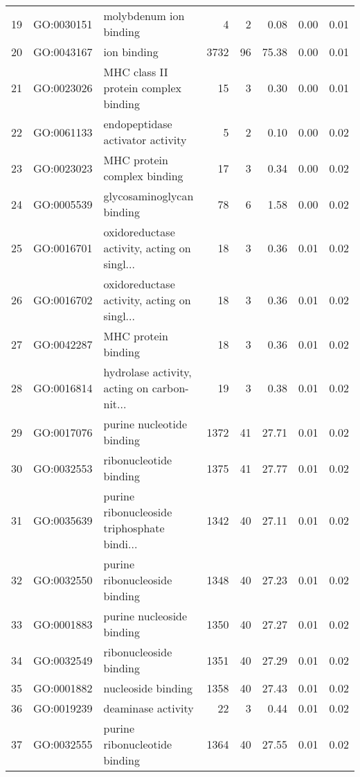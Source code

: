 \begin{table}[ht]
\begin{tabular}{rllrrrrr}
  19 & GO:0030151 & molybdenum ion binding &   4 &   2 & 0.08 & 0.00 & 0.01 \\ 
  20 & GO:0043167 & ion binding & 3732 &  96 & 75.38 & 0.00 & 0.01 \\ 
  21 & GO:0023026 & MHC class II protein complex binding &  15 &   3 & 0.30 & 0.00 & 0.01 \\ 
  22 & GO:0061133 & endopeptidase activator activity &   5 &   2 & 0.10 & 0.00 & 0.02 \\ 
  23 & GO:0023023 & MHC protein complex binding &  17 &   3 & 0.34 & 0.00 & 0.02 \\ 
  24 & GO:0005539 & glycosaminoglycan binding &  78 &   6 & 1.58 & 0.00 & 0.02 \\ 
  25 & GO:0016701 & oxidoreductase activity, acting on singl... &  18 &   3 & 0.36 & 0.01 & 0.02 \\ 
  26 & GO:0016702 & oxidoreductase activity, acting on singl... &  18 &   3 & 0.36 & 0.01 & 0.02 \\ 
  27 & GO:0042287 & MHC protein binding &  18 &   3 & 0.36 & 0.01 & 0.02 \\ 
  28 & GO:0016814 & hydrolase activity, acting on carbon-nit... &  19 &   3 & 0.38 & 0.01 & 0.02 \\ 
  29 & GO:0017076 & purine nucleotide binding & 1372 &  41 & 27.71 & 0.01 & 0.02 \\ 
  30 & GO:0032553 & ribonucleotide binding & 1375 &  41 & 27.77 & 0.01 & 0.02 \\ 
  31 & GO:0035639 & purine ribonucleoside triphosphate bindi... & 1342 &  40 & 27.11 & 0.01 & 0.02 \\ 
  32 & GO:0032550 & purine ribonucleoside binding & 1348 &  40 & 27.23 & 0.01 & 0.02 \\ 
  33 & GO:0001883 & purine nucleoside binding & 1350 &  40 & 27.27 & 0.01 & 0.02 \\ 
  34 & GO:0032549 & ribonucleoside binding & 1351 &  40 & 27.29 & 0.01 & 0.02 \\ 
  35 & GO:0001882 & nucleoside binding & 1358 &  40 & 27.43 & 0.01 & 0.02 \\ 
  36 & GO:0019239 & deaminase activity &  22 &   3 & 0.44 & 0.01 & 0.02 \\ 
  37 & GO:0032555 & purine ribonucleotide binding & 1364 &  40 & 27.55 & 0.01 & 0.02 \\ 
   \hline
\end{tabular}
\end{table}
